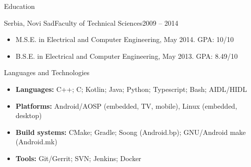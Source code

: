 \documentclass[]{mcdowellcv}
\begin{document}
	\begin{cvsection}{Education}
		\begin{cvsubsection}{Serbia, Novi Sad}{Faculty of Technical Sciences}{2009 -- 2014}
			\begin{itemize}
				\item M.S.E. in Electrical and Computer Engineering, May 2014. GPA: 10/10
				\item B.S.E. in Electrical and Computer Engineering, May 2013. GPA: 8.49/10
			\end{itemize}
		\end{cvsubsection}
	\end{cvsection}

	\begin{cvsection}{Languages and Technologies}
		\begin{cvsubsection}{}{}{}
			\begin{itemize}
				\item \textbf{Languages:} C++; C; Kotlin; Java; Python; Typescript; Bash; AIDL/HIDL
				\item \textbf{Platforms:} Android/AOSP (embedded, TV, mobile), Linux (embedded, desktop)
				\item \textbf{Build systems:} CMake; Gradle; Soong (Android.bp); GNU/Android make (Android.mk)
				\item \textbf{Tools:} Git/Gerrit; SVN; Jenkins; Docker
			\end{itemize}
		\end{cvsubsection}
	\end{cvsection}
\end{document}
